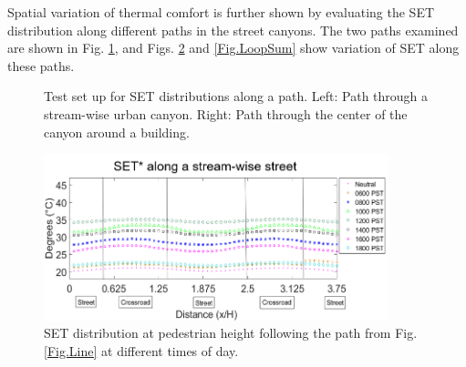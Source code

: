 \documentclass[preprint,3p,12pt,english]{elsarticle}
\begin{document}
Spatial variation of thermal comfort is further shown by evaluating the SET distribution along different paths in the street canyons.  The two paths examined are shown in Fig. \ref{Fig.Paths}, and Figs. \ref{Fig.LineSum} and \ref{Fig.LoopSum} show variation of SET along these paths.

\begin{figure}[H] \centering  
\graphicspath{ {image/} }
\hskip 0.5in
\hskip 0.5in 
\caption{Test set up for SET distributions along a path. Left: Path through a stream-wise urban canyon. Right: Path through the center of the canyon around a building.} 
\label{Fig.Paths}
\end{figure}

\begin{figure}[H]
\graphicspath{ {image/} }
\centerline{\includegraphics[width=10cm]{line_sum.png}}
\caption{SET distribution at pedestrian height following the path from Fig. \ref{Fig.Line} at different times of day.}
\label{Fig.LineSum}
\end{figure}
\end{document}
